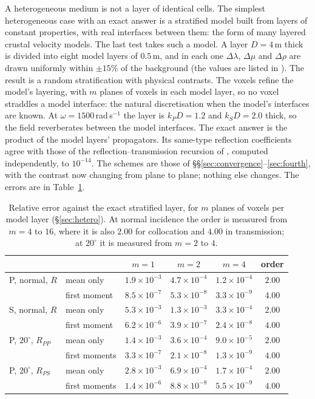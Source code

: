 \documentclass[extra,mreferee]{gji}
\begin{document}
A heterogeneous medium is not a layer of identical cells. The simplest heterogeneous case with an
exact answer is a stratified model built from layers of constant properties, with real interfaces
between them: the form of many layered crustal velocity models. The last test takes such a model. A
layer $D=4$\,m thick is divided into eight model layers of $0.5$\,m, and in each one $\Delta\lambda$, $\Delta\mu$
and $\Delta\rho$ are drawn uniformly within $\pm15\%$ of the background (the values are listed in
). The result is a random stratification with physical contrasts. The voxels refine
the model's layering, with $m$ planes of voxels in each model layer, so no voxel straddles a model
interface: the natural discretisation when the model's interfaces are known. At $\omega=1500$\,rad\,s$^{-1}$ the layer is
$k_PD=1.2$ and $k_SD=2.0$ thick, so the field reverberates between the model interfaces. The exact
answer is the product of the model layers' propagators. Its same-type reflection coefficients agree
with those of the reflection--transmission recursion of \citet{Kennett1983}, computed independently,
to $10^{-14}$. The schemes are those of \S\S\ref{sec:convergence}--\ref{sec:fourth}, with the
contrast now changing from plane to plane; nothing else changes. The errors are in Table~\ref{tab:hetero}.
\begin{table}
\centering
\caption{Relative error against the exact stratified layer, for $m$ planes of voxels per model layer (\S\ref{sec:hetero}). At normal incidence the order is measured from $m=4$ to $16$, where it is also $2.00$ for collocation and $4.00$ in transmission; at $20^\circ$ it is measured from $m=2$ to $4$.}\label{tab:hetero}
\small
\begin{tabular}{@{}llcccc@{}}
\toprule
 & & $m=1$ & $m=2$ & $m=4$ & order \\
\midrule
P, normal, $R$ & mean only & $1.9\times10^{-3}$ & $4.7\times10^{-4}$ & $1.2\times10^{-4}$ & $2.00$ \\
 & first moment & $8.5\times10^{-7}$ & $5.3\times10^{-8}$ & $3.3\times10^{-9}$ & $4.00$ \\
S, normal, $R$ & mean only & $5.3\times10^{-3}$ & $1.3\times10^{-3}$ & $3.3\times10^{-4}$ & $2.00$ \\
 & first moment & $6.2\times10^{-6}$ & $3.9\times10^{-7}$ & $2.4\times10^{-8}$ & $4.00$ \\
P, $20^\circ$, $R_{PP}$ & mean only & $1.4\times10^{-3}$ & $3.6\times10^{-4}$ & $9.0\times10^{-5}$ & $2.00$ \\
 & first moments & $3.3\times10^{-7}$ & $2.1\times10^{-8}$ & $1.3\times10^{-9}$ & $4.00$ \\
P, $20^\circ$, $R_{PS}$ & mean only & $2.8\times10^{-3}$ & $6.9\times10^{-4}$ & $1.7\times10^{-4}$ & $2.00$ \\
 & first moments & $1.4\times10^{-6}$ & $8.8\times10^{-8}$ & $5.5\times10^{-9}$ & $4.00$ \\
\bottomrule
\end{tabular}
\end{table}
\end{document}
